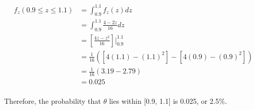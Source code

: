 \documentclass[12pt,a4paper]{article}
\begin{document}
\begin{enumerate}[label=(\alph*)]
    \begin{equation*}
        \begin{split}
            f_z(0.9 \leq z \leq 1.1) &= \int_{0.9}^{1.1}f_z(z) dz \\
                                     &= \int_{0.9}^{1.1} \frac{4-2z}{16} dz \\
                                     &= \left[\frac{4z - z^2}{16}\right]|_{0.9}^{1.1} \\ 
                                     &= \frac{1}{16} \left(\left[4(1.1)-(1.1)^2\right] - \left[4(0.9)-(0.9)^2\right]\right) \\
                                     &= \frac{1}{16} \left(3.19 - 2.79\right) \\ 
                                     &= 0.025 \\
        \end{split}
    \end{equation*}
    
Therefore, the probability that $\theta$ lies within [0.9, 1.1] is 0.025, or 2.5\%.

\end{enumerate}

\section{~}
\end{document}
